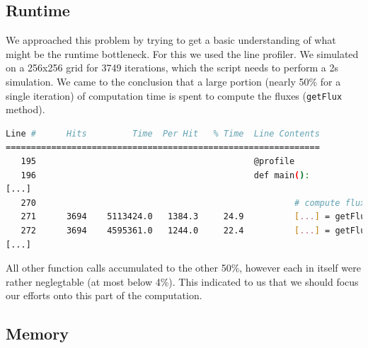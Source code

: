 \documentclass[a4paper,10pt]{article}
\begin{document}
\subsection{Runtime}
We approached this problem by trying to get a basic understanding of what might be the runtime bottleneck.
For this we used the line profiler.
We simulated on a 256x256 grid for 3749 iterations, which the script needs to perform a 2s simulation.
We came to the conclusion that a large portion (nearly 50\% for a single iteration) of computation time is spent to compute the fluxes (\verb|getFlux| method).
\begin{lstlisting}[language=bash,basicstyle=\scriptsize\ttfamily]
Line #      Hits         Time  Per Hit   % Time  Line Contents
==============================================================
   195                                           @profile
   196                                           def main():
[...]
   270                                                   # compute fluxes
   271      3694    5113424.0   1384.3     24.9          [...] = getFlux(...)
   272      3694    4595361.0   1244.0     22.4          [...] = getFlux(...)
[...]
\end{lstlisting}
All other function calls accumulated to the other 50\%, however each in itself were rather neglegtable (at most below 4\%).
This indicated to us that we should focus our efforts onto this part of the computation.

\subsection{Memory}
\end{document}
